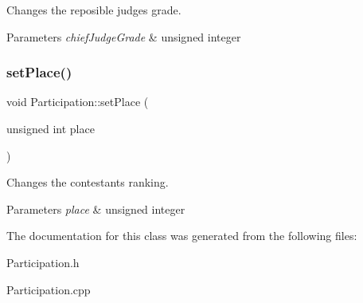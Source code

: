 Changes the reposible judge\textquotesingle{}s grade. 


\begin{DoxyParams}{Parameters}
{\em chief\+Judge\+Grade} & unsigned integer \\
\hline
\end{DoxyParams}
\mbox{\label{class_participation_a845f29c1f89a79783e2e93b281dc5846}} 
\subsubsection{\texorpdfstring{set\+Place()}{setPlace()}}
{\footnotesize\ttfamily void Participation\+::set\+Place (\begin{DoxyParamCaption}\item[{unsigned int}]{place }\end{DoxyParamCaption})}



Changes the contestant\textquotesingle{}s ranking. 


\begin{DoxyParams}{Parameters}
{\em place} & unsigned integer \\
\hline
\end{DoxyParams}


The documentation for this class was generated from the following files\+:\begin{DoxyCompactItemize}
\item 
Participation.\+h\item 
Participation.\+cpp\end{DoxyCompactItemize}
